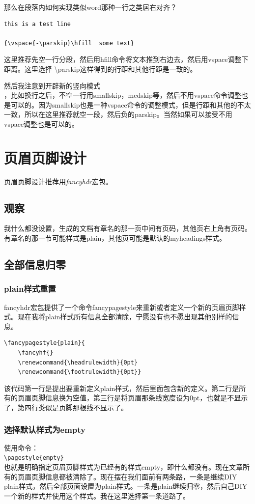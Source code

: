 \documentclass[12pt,oneside]{book}
\begin{document}
\begin{common-format}
那么在段落内如何实现类似word那种一行之类居右对齐？

\begin{Verbatim}
this is a test line

{\vspace{-\parskip}\hfill  some text}
\end{Verbatim}

这里推荐先空一行分段，然后用hfill命令将文本推到右边去，然后用vspace调整下距离。这里选择-\textbackslash parskip这样得到的行距和其他行距是一致的。

{\vspace{-\parskip}\hfill  然后我注意到开辟新的竖向模式}\\，比如换行之后，不空一行用smallskip，medskip等，然后不用vspace命令调整也是可以的。因为smallskip也是一种vspace命令的调整模式，但是行距和其他的不太一致，所以在这里推荐就空一段，然后负的parskip。当然如果可以接受不用vspace调整也是可以的。



\section{页眉页脚设计}
页眉页脚设计推荐用\emph{fancyhdr}宏包。
\subsection{观察}
我什么都没设置，生成的文档有章名的那一页中间有页码，其他页右上角有页码。有章名的那一节可能样式是plain，其他页可能是默认的myheadings样式。

\subsection{全部信息归零}
\subsubsection{plain样式重置}
fancyhdr宏包提供了一个命令fancypagestyle来重新或者定义一个新的页眉页脚样式。现在我将plain样式所有信息全部清除，宁愿没有也不愿出现其他别样的信息。
\begin{Verbatim}
\fancypagestyle{plain}{
    \fancyhf{}
    \renewcommand{\headrulewidth}{0pt}
    \renewcommand{\footrulewidth}{0pt}}
\end{Verbatim}
该代码第一行是提出要重新定义plain样式，然后里面包含新的定义。第二行是所有的页眉页脚信息换为空值，第三行是将页眉那条线宽度设为0pt，也就是不显示了，第四行类似是页脚那根线不显示了。

\subsubsection{选择默认样式为empty}
使用命令：\\
\verb+\pagestyle{empty}+\\
也就是明确指定页眉页脚样式为已经有的样式empty，即什么都没有。现在文章所有的页眉页脚信息都被清除了。现在摆在我们面前有两条路，一条是继续DIY plain样式，然后全部页面设置为plain样式。一条是plain继续归零，然后自己DIY一个新的样式并使用这个样式。我在这里选择第一条道路了。


\end{common-format}
\end{document}
